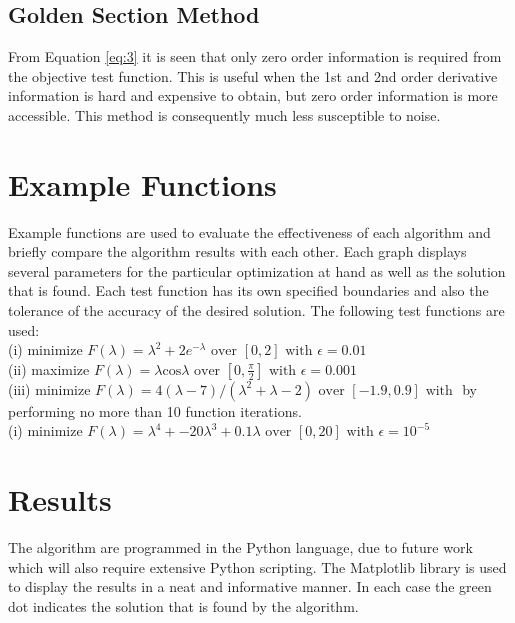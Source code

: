 \documentclass[a4paper,10pt]{article}
\begin{document}
\subsection{Golden Section Method}
From Equation \ref{eq:3} it is seen that only zero order information is required from the objective test function. This is useful when the 1st and 2nd order derivative information is hard and expensive to obtain, but zero order information is more accessible. This method is consequently much less susceptible to noise.

\section{Example Functions}
Example functions are used to evaluate the effectiveness of each algorithm and briefly compare the algorithm results with each other. Each graph displays several parameters for the particular optimization at hand as well as the solution that is found. Each test function has its own specified boundaries and also the tolerance of the accuracy of the desired solution. The following test functions are used:
\\[0.5cm]
(i) minimize $F(\lambda) = \lambda^{2} + 2e^{-\lambda} \text{ over } [0,2] \text{ with } \epsilon = 0.01$
\\[0.5cm]
(ii) maximize $F(\lambda) = \lambda \text{cos} \lambda \text{ over } [0,\frac{\pi}{2}] \text{ with } \epsilon = 0.001$
\\[0.5cm]
(iii) minimize $F(\lambda) = 4(\lambda - 7) / (\lambda^{2} + \lambda - 2) \text{ over } [-1.9,0.9] \text{ with }$ by performing no more than 10 function iterations.
\\[0.5cm]
(i) minimize $F(\lambda) = \lambda^{4} + -20\lambda^{3} + 0.1\lambda \text{ over } [0,20] \text{ with } \epsilon = 10^{-5}$

\section{Results}
The algorithm are programmed in the Python language, due to future work which will also require extensive Python scripting. The Matplotlib library is used to display the results in a neat and informative manner. In each case the green dot indicates the solution that is found by the algorithm.

\newpage
\end{document}
